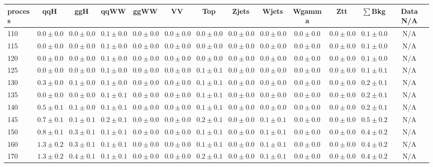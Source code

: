 \begin{table}
{%
 \tiny
 \begin{center}
 \begin{tabular}{l | c c | c c c c c c c c  | c c}
 \hline
 process & qqH & ggH & qqWW & ggWW & VV & Top & Zjets & Wjets & Wgamma & Ztt & $\sum$Bkg & Data N/A \\
 \hline
110 & $0.0\pm0.0$ & $0.0\pm0.0$ & $0.1\pm0.0$ & $0.0\pm0.0$ & $0.0\pm0.0$ & $0.0\pm0.0$ & $0.0\pm0.0$ & $0.0\pm0.0$ & $0.0\pm0.0$ & $0.0\pm0.0$ & $0.1\pm0.0$ & N/A \\
115 & $0.0\pm0.0$ & $0.0\pm0.0$ & $0.1\pm0.0$ & $0.0\pm0.0$ & $0.0\pm0.0$ & $0.0\pm0.0$ & $0.0\pm0.0$ & $0.0\pm0.0$ & $0.0\pm0.0$ & $0.0\pm0.0$ & $0.1\pm0.0$ & N/A \\
120 & $0.0\pm0.0$ & $0.0\pm0.0$ & $0.1\pm0.0$ & $0.0\pm0.0$ & $0.0\pm0.0$ & $0.0\pm0.0$ & $0.0\pm0.0$ & $0.0\pm0.0$ & $0.0\pm0.0$ & $0.0\pm0.0$ & $0.1\pm0.0$ & N/A \\
125 & $0.0\pm0.0$ & $0.0\pm0.0$ & $0.1\pm0.0$ & $0.0\pm0.0$ & $0.0\pm0.0$ & $0.1\pm0.1$ & $0.0\pm0.0$ & $0.0\pm0.0$ & $0.0\pm0.0$ & $0.0\pm0.0$ & $0.1\pm0.1$ & N/A \\
130 & $0.3\pm0.0$ & $0.1\pm0.0$ & $0.1\pm0.0$ & $0.0\pm0.0$ & $0.0\pm0.0$ & $0.1\pm0.1$ & $0.0\pm0.0$ & $0.0\pm0.0$ & $0.0\pm0.0$ & $0.0\pm0.0$ & $0.2\pm0.1$ & N/A \\
135 & $0.0\pm0.0$ & $0.0\pm0.0$ & $0.1\pm0.1$ & $0.0\pm0.0$ & $0.0\pm0.0$ & $0.1\pm0.1$ & $0.0\pm0.0$ & $0.0\pm0.0$ & $0.0\pm0.0$ & $0.0\pm0.0$ & $0.2\pm0.1$ & N/A \\
140 & $0.5\pm0.1$ & $0.1\pm0.0$ & $0.1\pm0.1$ & $0.0\pm0.0$ & $0.0\pm0.0$ & $0.1\pm0.1$ & $0.0\pm0.0$ & $0.0\pm0.0$ & $0.0\pm0.0$ & $0.0\pm0.0$ & $0.2\pm0.1$ & N/A \\
145 & $0.7\pm0.1$ & $0.1\pm0.1$ & $0.2\pm0.1$ & $0.0\pm0.0$ & $0.0\pm0.0$ & $0.2\pm0.1$ & $0.0\pm0.0$ & $0.1\pm0.1$ & $0.0\pm0.0$ & $0.0\pm0.0$ & $0.5\pm0.2$ & N/A \\
150 & $0.8\pm0.1$ & $0.3\pm0.1$ & $0.1\pm0.1$ & $0.0\pm0.0$ & $0.0\pm0.0$ & $0.1\pm0.1$ & $0.0\pm0.0$ & $0.1\pm0.1$ & $0.0\pm0.0$ & $0.0\pm0.0$ & $0.4\pm0.2$ & N/A \\
160 & $1.3\pm0.2$ & $0.3\pm0.1$ & $0.1\pm0.1$ & $0.0\pm0.0$ & $0.0\pm0.0$ & $0.1\pm0.1$ & $0.0\pm0.0$ & $0.1\pm0.1$ & $0.0\pm0.0$ & $0.0\pm0.0$ & $0.4\pm0.2$ & N/A \\
170 & $1.3\pm0.2$ & $0.4\pm0.1$ & $0.1\pm0.1$ & $0.0\pm0.0$ & $0.0\pm0.0$ & $0.2\pm0.1$ & $0.0\pm0.0$ & $0.1\pm0.1$ & $0.0\pm0.0$ & $0.0\pm0.0$ & $0.4\pm0.2$ & N/A \\

\end{tabular}
\end{center}}
\end{table}
